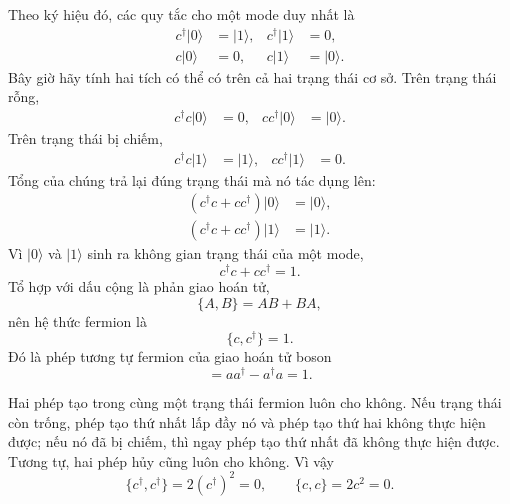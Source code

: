 Theo ký hiệu đó, các quy tắc cho một mode duy nhất là
\begin{align}
c^\dagger|0\rangle&=|1\rangle,
&c^\dagger|1\rangle&=0,
\\
c|0\rangle&=0,
&c|1\rangle&=|0\rangle.
\end{align}
Bây giờ hãy tính hai tích có thể có trên cả hai trạng thái cơ sở. Trên trạng thái rỗng,
\begin{align}
c^\dagger c|0\rangle&=0,
&
cc^\dagger|0\rangle&=|0\rangle.
\end{align}
Trên trạng thái bị chiếm,
\begin{align}
c^\dagger c|1\rangle&=|1\rangle,
&
cc^\dagger|1\rangle&=0.
\end{align}
Tổng của chúng trả lại đúng trạng thái mà nó tác dụng lên:
\begin{align}
(c^\dagger c+cc^\dagger)|0\rangle&=|0\rangle,
\\
(c^\dagger c+cc^\dagger)|1\rangle&=|1\rangle.
\end{align}
Vì \(|0\rangle\) và \(|1\rangle\) sinh ra không gian trạng thái của một mode,
\begin{equation}
c^\dagger c+cc^\dagger=1.
\end{equation}
Tổ hợp với dấu cộng là phản giao hoán tử,
\begin{equation}
\{A,B\}=AB+BA,
\end{equation}
nên hệ thức fermion là
\begin{equation}
\{c,c^\dagger\}=1.
\end{equation}
Đó là phép tương tự fermion của giao hoán tử boson
\begin{equation}
[a,a^\dagger]=aa^\dagger-a^\dagger a=1.
\end{equation}

Hai phép tạo trong cùng một trạng thái fermion luôn cho không. Nếu trạng thái còn trống, phép tạo thứ nhất lấp đầy nó và phép tạo thứ hai không thực hiện được; nếu nó đã bị chiếm, thì ngay phép tạo thứ nhất đã không thực hiện được. Tương tự, hai phép hủy cũng luôn cho không. Vì vậy
\begin{equation}
\{c^\dagger,c^\dagger\}=2(c^\dagger)^2=0,
\qquad
\{c,c\}=2c^2=0.
\end{equation}

\begin{classroomqa}
\end{classroomqa}

